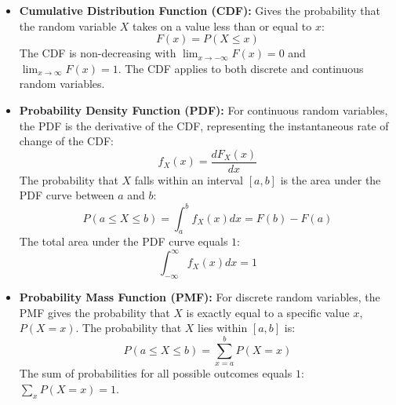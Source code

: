 \begin{itemize}
	\item \textbf{Cumulative Distribution Function (CDF):} Gives the probability that the random variable $X$ takes on a value less than or equal to $x$:
	\begin{equation}
		F(x) = P(X \le x)
		\label{eq:cdf_def_m6}
	\end{equation}
	The CDF is non-decreasing with $\lim_{x \to -\infty} F(x) = 0$ and $\lim_{x \to \infty} F(x) = 1$. The CDF applies to both discrete and continuous random variables.
	

	\item \textbf{Probability Density Function (PDF):} For continuous random variables, the PDF is the derivative of the CDF, representing the instantaneous rate of change of the CDF:
	\begin{equation}
		f_X(x) = \frac{dF_X(x)}{dx}
		\label{eq:pdf_derivative_m6}
	\end{equation}
	The probability that $X$ falls within an interval $[a, b]$ is the area under the PDF curve between $a$ and $b$:
	\begin{equation}
		P(a \le X \le b) = \int_a^b f_X(x) dx = F(b) - F(a)
		\label{eq:pdf_probability_interval_m6}
	\end{equation}
	The total area under the PDF curve equals $1$:
	\begin{equation}
		\int_{-\infty}^{\infty} f_X(x) dx = 1
		\label{eq:pdf_total_area_m6}
	\end{equation}
	

	\item \textbf{Probability Mass Function (PMF):} For discrete random variables, the PMF gives the probability that $X$ is exactly equal to a specific value $x$, $P(X=x)$. The probability that $X$ lies within $[a, b]$ is:
	\begin{equation}
		P(a \le X \le b) = \sum_{x=a}^b P(X=x)
		\label{eq:pmf_probability_interval_m6}
	\end{equation}
	The sum of probabilities for all possible outcomes equals $1$: $\sum_x P(X=x) = 1$.
	

\end{itemize}
